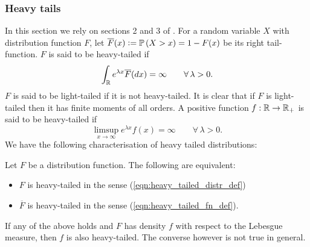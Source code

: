 
\subsubsection{Heavy tails}
In this section we rely on sections 2 and 3 of \cite{foss2011introduction}. For a random variable $X$ with distribution function $F$, let $\overline{F}(x) \vcentcolon= \mathbb{P} \left( X > x \right) = 1 - F(x)$ be its right tail-function. $F$ is said to be heavy-tailed if 
\begin{equation}\label{eqn:heavy_tailed_distr_def}
\int_{\mathbb{R}} e^{\lambda x} \overline{F}(dx) = \infty\qquad\forall\, \lambda > 0. 
\end{equation}
$F$ is said to be light-tailed if it is not heavy-tailed. It is clear that if $F$ is light-tailed then it has finite moments of all orders. A positive function $f : \mathbb{R} \to \mathbb{R}_+$ is said to be heavy-tailed if 
\begin{equation}\label{eqn:heavy_tailed_fn_def}
\limsup\limits_{x \to \infty} e^{\lambda x} f(x) = \infty\qquad\forall\,\lambda > 0. 
\end{equation}
We have the following characterisation of heavy tailed distributions:

\begin{theorem}
Let $F$ be a distribution function. The following are equivalent:
\begin{itemize}
\item $F$ is heavy-tailed in the sense (\ref{eqn:heavy_tailed_distr_def})
\item $\overline{F}$ is heavy-tailed in the sense (\ref{eqn:heavy_tailed_fn_def}). 
\end{itemize}
If any of the above holds and $F$ has density $f$ with respect to the Lebesgue measure, then $f$ is also heavy-tailed. The converse however is not true in general. 
\end{theorem}


